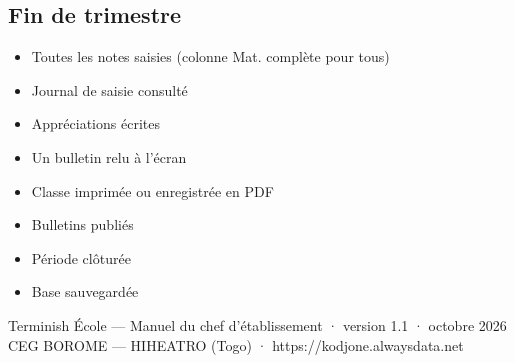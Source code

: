 \documentclass[11pt,a4paper]{article}
\begin{document}
\subsection*{Fin de trimestre}
\begin{itemize}[label=$\square$]
  \item Toutes les notes saisies (colonne Mat. complète pour tous)
  \item Journal de saisie consulté
  \item Appréciations écrites
  \item Un bulletin relu à l'écran
  \item Classe imprimée ou enregistrée en PDF
  \item Bulletins publiés
  \item Période clôturée
  \item Base sauvegardée
\end{itemize}

\vfill
\begin{center}
\small\color{gris}
Terminish École — Manuel du chef d'établissement · version 1.1 · octobre 2026\\
CEG BOROME — HIHEATRO (Togo) · https://kodjone.alwaysdata.net
\end{center}
\end{document}
